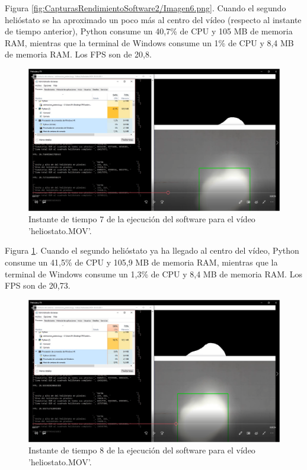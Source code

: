 Figura \ref{fig:CapturasRendimientoSoftware2/Imagen6.png}. Cuando el segundo helióstato se ha aproximado un poco más al centro del vídeo (respecto al instante de tiempo anterior), Python consume un 40,7\% de CPU y 105 MB de memoria RAM, mientras que la terminal de Windows consume un 1\% de CPU y 8,4 MB de memoria RAM. Los FPS son de 20,8.

\begin{figure}[h!]
  	\centering
	\includegraphics[width=\textwidth]{CapturasRendimientoSoftware2/Imagen7.png}
	\caption{Instante de tiempo 7 de la ejecución del software para el vídeo 'heliostato.MOV'.
	\label{fig:CapturasRendimientoSoftware2/Imagen7.png}}
\end{figure}

Figura \ref{fig:CapturasRendimientoSoftware2/Imagen7.png}. Cuando el segundo helióstato ya ha llegado al centro del vídeo, Python consume un 41,5\% de CPU y 105,9 MB de memoria RAM, mientras que la terminal de Windows consume un 1,3\% de CPU y 8,4 MB de memoria RAM. Los FPS son de 20,73.

\begin{figure}[h!]
  	\centering
	\includegraphics[width=\textwidth]{CapturasRendimientoSoftware2/Imagen8.png}
	\caption{Instante de tiempo 8 de la ejecución del software para el vídeo 'heliostato.MOV'.
	\label{fig:CapturasRendimientoSoftware2/Imagen8.png}}
\end{figure}

